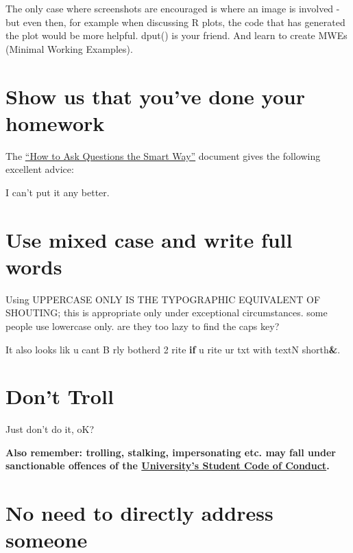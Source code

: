 \documentclass[]{book}
\newenvironment{Shaded}{\begin{snugshade}}{\end{snugshade}}
\newcommand{\DecValTok}[1]{\textcolor[rgb]{0.00,0.00,0.81}{#1}}
\newcommand{\ControlFlowTok}[1]{\textcolor[rgb]{0.13,0.29,0.53}{\textbf{#1}}}
\newcommand{\OperatorTok}[1]{\textcolor[rgb]{0.81,0.36,0.00}{\textbf{#1}}}
\newcommand{\NormalTok}[1]{#1}
\begin{document}
The only case where screenshots are encouraged is where an image is
involved - but even then, for example when discussing R plots, the code
that has generated the plot would be more helpful. dput() is your
friend. And learn to create MWEs (Minimal Working Examples).

\section{Show us that you've done your
homework}\label{show-us-that-youve-done-your-homework}

The \href{http://www.catb.org/~esr/faqs/smart-questions.html}{``How to
Ask Questions the Smart Way''} document gives the following excellent
advice:

I can't put it any better.

\section{Use mixed case and write full
words}\label{use-mixed-case-and-write-full-words}

Using UPPERCASE ONLY IS THE TYPOGRAPHIC EQUIVALENT OF SHOUTING; this is
appropriate only under exceptional circumstances. some people use
lowercase only. are they too lazy to find the caps key?

\begin{Shaded}
\begin{Highlighting}[]
\NormalTok{It also looks lik u cant B rly botherd }\DecValTok{2}\NormalTok{ rite }
\ControlFlowTok{if}\NormalTok{ u rite ur txt with textN shorth}\OperatorTok{&}\NormalTok{.}
\end{Highlighting}
\end{Shaded}

\section{Don't Troll}\label{dont-troll}

Just don't do it, oK?

\textbf{Also remember: trolling, stalking, impersonating etc. may fall
under sanctionable offences of the
\href{https://governingcouncil.utoronto.ca/secretariat/policies/code-student-conduct-february-14-2002}{University's
Student Code of Conduct}.}

\section{No need to directly address
someone}\label{no-need-to-directly-address-someone}
\end{document}
